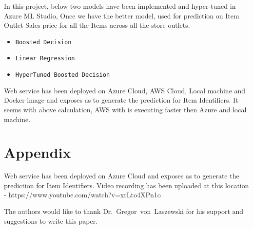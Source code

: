 In this project, below two models have been implemented and 
hyper-tuned in Azure ML Studio, Once we have the better model, used for 
prediction on Item Outlet Sales price for all the Items 
across all the store outlets.
\begin{itemize}
\item \verb|Boosted Decision|
\item \verb|Linear Regression|
\item \verb|HyperTuned Boosted Decision|
\end{itemize}
Web service has been deployed on Azure Cloud, AWS Cloud, Local machine 
and Docker image and exposes 
as to generate the prediction for Item Identifiers. It seems with above 
calculation, AWS with is executing faster then Azure and local machine.

\section{Appendix}

Web service has been deployed on Azure Cloud and exposes as to generate the prediction for Item Identifiers.
Video recording has been uploaded at this location -
https://www.youtube.com/watch?v=xrLto4XPn1o


\begin{acks}

  The authors would like to thank Dr.~Gregor~von~Laszewski for his
  support and suggestions to write this paper.

\end{acks}


 
